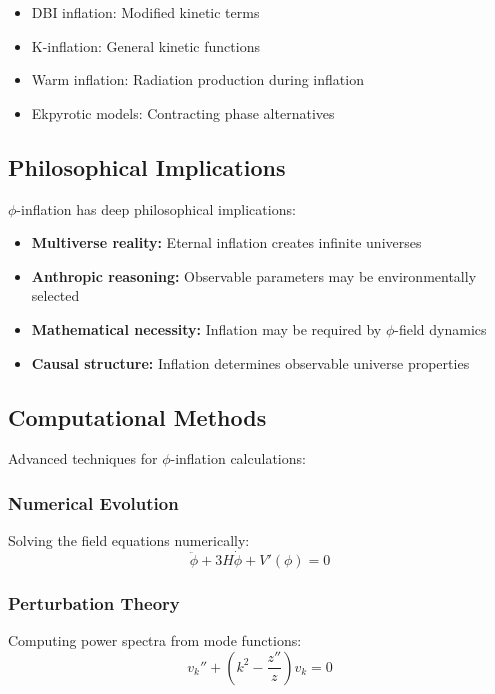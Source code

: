 \begin{itemize}
\item DBI inflation: Modified kinetic terms
\item K-inflation: General kinetic functions  
\item Warm inflation: Radiation production during inflation
\item Ekpyrotic models: Contracting phase alternatives
\end{itemize}

\subsection{Philosophical Implications}

$\phi$-inflation has deep philosophical implications:

\begin{itemize}
\item \textbf{Multiverse reality:} Eternal inflation creates infinite universes
\item \textbf{Anthropic reasoning:} Observable parameters may be environmentally selected
\item \textbf{Mathematical necessity:} Inflation may be required by $\phi$-field dynamics
\item \textbf{Causal structure:} Inflation determines observable universe properties
\end{itemize}

\subsection{Computational Methods}

Advanced techniques for $\phi$-inflation calculations:

\subsubsection{Numerical Evolution}

Solving the field equations numerically:
\begin{equation}
\ddot{\phi} + 3H\dot{\phi} + V'(\phi) = 0
\end{equation}

\subsubsection{Perturbation Theory}

Computing power spectra from mode functions:
\begin{equation}
v_k'' + \left(k^2 - \frac{z''}{z}\right)v_k = 0
\end{equation}

